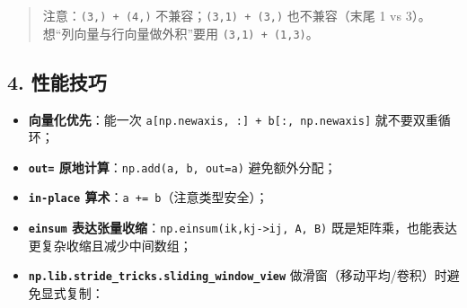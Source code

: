 \begin{Shaded}
\begin{Highlighting}[]

\OperatorTok{=}\NormalTok{, }\NormalTok{, }\NormalTok{))}
\OperatorTok{=}\NormalTok{, }\NormalTok{))}
\NormalTok{:}
    \OperatorTok{+}
  
    \NormalTok{(}
\end{Highlighting}
\end{Shaded}

\begin{quote}
注意：\texttt{(3,)\ +\ (4,)} 不兼容；\texttt{(3,1)\ +\ (3,)}
也不兼容（末尾 1 vs 3）。想``列向量与行向量做外积''要用
\texttt{(3,1)\ +\ (1,3)}。
\end{quote}

\subsection{4. 性能技巧}\label{ux6027ux80fdux6280ux5de7}

\begin{itemize}
\tightlist
\item
  \textbf{向量化优先}：能一次
  \texttt{a{[}np.newaxis,\ :{]}\ +\ b{[}:,\ np.newaxis{]}}
  就不要双重循环；
\item
  \textbf{\texttt{out=} 原地计算}：\texttt{np.add(a,\ b,\ out=a)}
  避免额外分配；
\item
  \textbf{\texttt{in-place} 算术}：\texttt{a\ +=\ b}（注意类型安全）；
\item
  \textbf{\texttt{einsum}
  表达张量收缩}：\texttt{np.einsum(\textquotesingle{}ik,kj-\textgreater{}ij\textquotesingle{},\ A,\ B)}
  既是矩阵乘，也能表达更复杂收缩且减少中间数组；
\item
  \textbf{\texttt{np.lib.stride\_tricks.sliding\_window\_view}}
  做滑窗（移动平均/卷积）时避免显式复制：
\end{itemize}

\begin{Shaded}
\begin{Highlighting}[]
\OperatorTok{=}\OperatorTok{=}\NormalTok{)}

\OperatorTok{=}\NormalTok{)}
\OperatorTok{=}\NormalTok{)}
\OperatorTok{=}\NormalTok{))   }
\end{Highlighting}
\end{Shaded}

